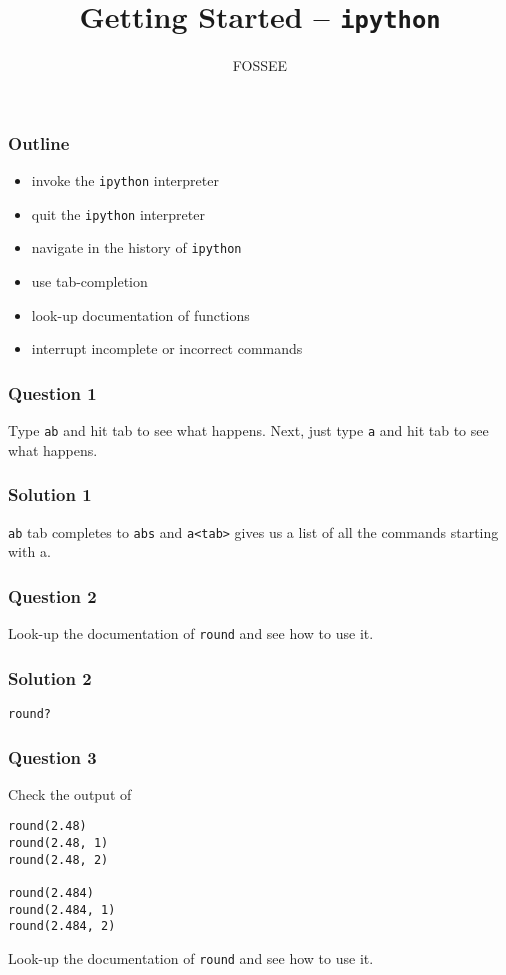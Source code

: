 \documentclass[presentation]{beamer}
\title{Getting Started -- \texttt{ipython}}
\author{FOSSEE}
\date{}
\begin{document}
\maketitle









\begin{frame}
\frametitle{Outline}
\label{sec-1}

\begin{itemize}
\item invoke the \texttt{ipython} interpreter
\item quit the \texttt{ipython} interpreter
\item navigate in the history of \texttt{ipython}
\item use tab-completion
\item look-up documentation of functions
\item interrupt incomplete or incorrect commands
\end{itemize}
\end{frame}
\begin{frame}
\frametitle{Question 1}
\label{sec-2}

  Type \texttt{ab} and hit tab to see what happens. Next, just type \texttt{a} and
  hit tab to see what happens.
\end{frame}
\begin{frame}
\frametitle{Solution 1}
\label{sec-3}

  \texttt{ab} tab completes to \texttt{abs} and \texttt{a<tab>} gives us a list of all the
  commands starting with a.
\end{frame}
\begin{frame}
\frametitle{Question 2}
\label{sec-4}

  Look-up the documentation of \texttt{round} and see how to use it.
\end{frame}
\begin{frame}
\frametitle{Solution 2}
\label{sec-5}

  \texttt{round?}
\end{frame}
\begin{frame}[fragile]
\frametitle{Question 3}
\label{sec-6}

  Check the output of
\begin{verbatim}
round(2.48)
round(2.48, 1)
round(2.48, 2)

round(2.484)
round(2.484, 1)
round(2.484, 2)
\end{verbatim}
  Look-up the documentation of \texttt{round} and see how to use it.
\end{frame}
\end{document}
